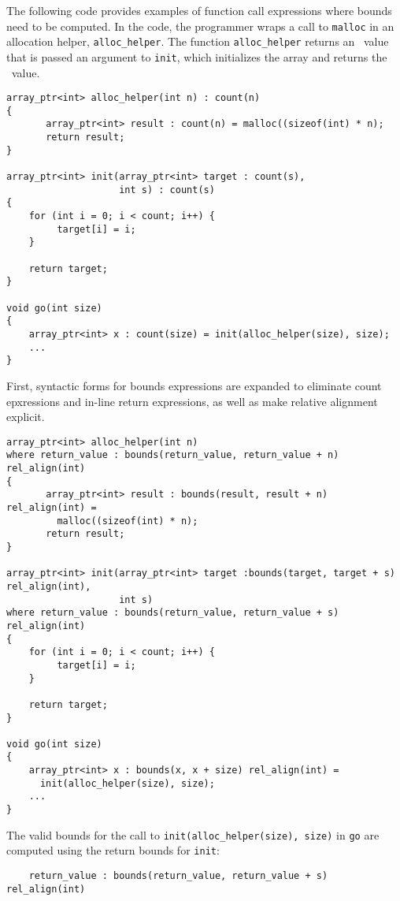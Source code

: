 The following code provides examples of function call expressions where
bounds need to be computed. In the code, the programmer wraps a call to
\texttt{malloc} in an allocation helper, \texttt{alloc\_helper}. The
function \texttt{alloc\_helper} returns an \arrayptr\ value
that is passed an argument to \texttt{init}, which initializes the array
and returns the \arrayptr\ value.
\begin{verbatim}
array_ptr<int> alloc_helper(int n) : count(n)
{
       array_ptr<int> result : count(n) = malloc((sizeof(int) * n);
       return result;
}

array_ptr<int> init(array_ptr<int> target : count(s), 
                    int s) : count(s)
{
    for (int i = 0; i < count; i++) {
         target[i] = i;
    }

    return target;
}

void go(int size) 
{
    array_ptr<int> x : count(size) = init(alloc_helper(size), size);
    ...
}
\end{verbatim}

First, syntactic forms for bounds expressions are expanded to eliminate
count epxressions and in-line return expressions, as well as make
relative alignment explicit.

\begin{verbatim}
array_ptr<int> alloc_helper(int n)
where return_value : bounds(return_value, return_value + n) rel_align(int)
{
       array_ptr<int> result : bounds(result, result + n) rel_align(int) =
         malloc((sizeof(int) * n);
       return result;
}

array_ptr<int> init(array_ptr<int> target :bounds(target, target + s) rel_align(int), 
                    int s) 
where return_value : bounds(return_value, return_value + s) rel_align(int)
{
    for (int i = 0; i < count; i++) {
         target[i] = i;
    }

    return target;
}

void go(int size) 
{
    array_ptr<int> x : bounds(x, x + size) rel_align(int) = 
      init(alloc_helper(size), size);
    ...
}
\end{verbatim}

The valid bounds for the call to \texttt{init(alloc\_helper(size),
size)} in \texttt{go} are computed using the return bounds for
\texttt{init}:

\begin{verbatim}
    return_value : bounds(return_value, return_value + s) rel_align(int)
\end{verbatim}

